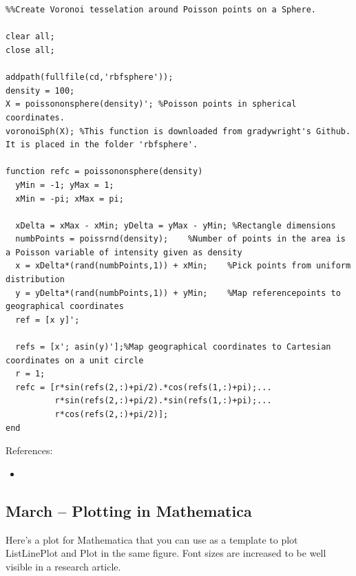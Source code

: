 \documentclass{article}
\begin{document}
\begin{verbatim}


%%Create Voronoi tesselation around Poisson points on a Sphere.

clear all;
close all;

addpath(fullfile(cd,'rbfsphere'));
density = 100;
X = poissononsphere(density)'; %Poisson points in spherical coordinates.
voronoiSph(X); %This function is downloaded from gradywright's Github. It is placed in the folder 'rbfsphere'.

function refc = poissononsphere(density)
  yMin = -1; yMax = 1;
  xMin = -pi; xMax = pi;
  
  xDelta = xMax - xMin; yDelta = yMax - yMin; %Rectangle dimensions
  numbPoints = poissrnd(density);    %Number of points in the area is a Poisson variable of intensity given as density
  x = xDelta*(rand(numbPoints,1)) + xMin;    %Pick points from uniform distribution
  y = yDelta*(rand(numbPoints,1)) + yMin;    %Map referencepoints to geographical coordinates
  ref = [x y]';

  refs = [x'; asin(y)'];%Map geographical coordinates to Cartesian coordinates on a unit circle
  r = 1;
  refc = [r*sin(refs(2,:)+pi/2).*cos(refs(1,:)+pi);...
          r*sin(refs(2,:)+pi/2).*sin(refs(1,:)+pi);...
          r*cos(refs(2,:)+pi/2)];
end

\end{verbatim}



References:
\begin{itemize}
\item {}
\end{itemize}



\subsection{March – Plotting in Mathematica}

Here's a plot for Mathematica that you can use as a template to plot ListLinePlot and Plot in the same figure. Font sizes are increased to be well visible in a research article. 
\end{document}

